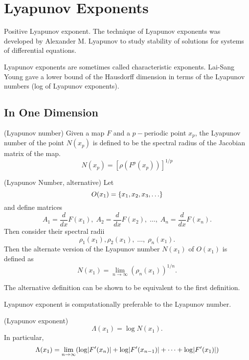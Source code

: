 \documentclass[11pt]{article}
\begin{document}
\section{Lyapunov Exponents}
Positive Lyapunov exponent.\citet{kantz-schreiber} 
The technique of Lyapunov exponents was developed by Alexander M. Lyapunov to study stability of solutions for systems of differential equations.

Lyapunov exponents are sometimes called characteristic exponents.
Lai-Sang Young gave a lower bound of the Hausdorff dimension in terms of the Lyapunov numbers (log of Lyapunov exponents).


\subsection{In One Dimension}
\begin{definition}
  (Lyapunov number)
  Given a map $F$ and a $p-$periodic point $x_p$, the Lyapunov number of the point $N(x_p)$ is
  defined to be the spectral radius of the Jacobian matrix of the map.
  \begin{equation*}
    N(x_p) = \left[ \rho\left( F^p(x_p) \right) \right]^{1/p}
  \end{equation*}
  \label{def:lyapnum}
\end{definition}

\begin{definition}
  (Lyapunov Number, alternative)
  Let
  \begin{equation*}
    O(x_1) = \{x_1, x_2, x_3, \ldots\}
  \end{equation*}
  and define matrices
  \begin{equation*}
    A_1 = \frac{d}{dx}F(x_1),\; A_2 = \frac{d}{dx}F(x_2),\; \ldots,\; A_n = \frac{d}{dx}F(x_n).
  \end{equation*}
  Then consider their spectral radii
  \begin{equation*}
    \rho_1(x_1), \rho_2(x_1),\; \ldots,\; \rho_n(x_1).
  \end{equation*}
  Then the alternate version of the Lyapunov number $N(x_1)$ of $O(x_1)$ is defined as 
  \begin{equation*}
    N(x_1) = \lim\limits_{n \to \infty} (\rho_n(x_1))^{1/n}.
  \end{equation*}
\end{definition}
The alternative definition can be shown to be equivalent to the first definition.

Lyapunov exponent is computationally preferable to the Lyapunov number.
\begin{definition}
  (Lyapunov exponent)
  \begin{equation*}
    \Lambda(x_1) = \log N(x_1).
  \end{equation*}
  In particular,
  \begin{equation*}
    \Lambda(x_1) = \lim\limits_{n \to \infty} \paren*{\log\abs{F'(x_n)} + \log\abs{F'(x_{n-1})} + \cdots + \log\abs{F'(x_1)}}
  \end{equation*}
\end{definition}
\end{document}
